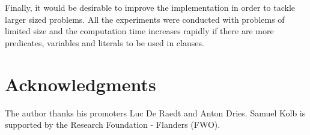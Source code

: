 \documentclass[letterpaper]{article}
\theoremstyle{definition}
\begin{document}
Finally, it would be desirable to improve the implementation in order to tackle larger sized problems.
All the experiments were conducted with problems of limited size and the computation time increases rapidly if there are more predicates, variables and literals to be used in clauses.

\section*{Acknowledgments}
The author thanks his promoters Luc De Raedt and Anton Dries.
Samuel Kolb is supported by the Research Foundation - Flanders (FWO).

\newpage
%
%


\end{document}
